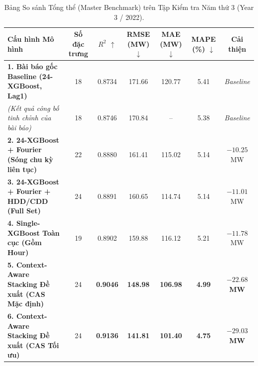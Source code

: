 \begin{table}[htbp]
    \centering
    \small
    \caption{Bảng So sánh Tổng thể (Master Benchmark) trên Tập Kiểm tra Năm thứ 3 (Year 3 / 2022).}
    \label{tab:master_benchmark}
    \begin{tabularx}{\textwidth}{lcccccc}
        \toprule
        \textbf{Cấu hình Mô hình} & \textbf{Số đặc trưng} & \textbf{$R^2$ $\uparrow$} & \textbf{RMSE (MW) $\downarrow$} & \textbf{MAE (MW) $\downarrow$} & \textbf{MAPE (\%) $\downarrow$} & \textbf{Cải thiện} \\
        \midrule
        \textbf{1. Bài báo gốc Baseline (24-XGBoost, Lag1)} & 18 & 0.8734 & 171.66 & 120.77 & 5.41 & \textit{Baseline} \\
        \textit{(Kết quả công bố tinh chỉnh của bài báo)} & 18 & 0.8746 & 170.84 & -- & 5.38 & \textit{Baseline} \\
        \addlinespace[0.4em]
        \textbf{2. 24-XGBoost + Fourier (Sóng chu kỳ liên tục)} & 22 & 0.8880 & 161.41 & 115.02 & 5.14 & $-10.25$ MW \\
        \textbf{3. 24-XGBoost + Fourier + HDD/CDD (Full Set)} & 24 & 0.8891 & 160.65 & 114.74 & 5.14 & $-11.01$ MW \\
        \addlinespace[0.4em]
        \textbf{4. Single-XGBoost Toàn cục (Gồm Hour)} & 19 & 0.8902 & 159.88 & 116.12 & 5.21 & $-11.78$ MW \\
        \addlinespace[0.4em]
        \textbf{5. Context-Aware Stacking Đề xuất (CAS Mặc định)} & 24 & \textbf{0.9046} & \textbf{148.98} & \textbf{106.98} & \textbf{4.99} & \textbf{$-22.68$ MW} \\
        \textbf{6. Context-Aware Stacking Đề xuất (CAS Tối ưu)} & 24 & \textbf{0.9136} & \textbf{141.81} & \textbf{101.40} & \textbf{4.75} & \textbf{$-29.03$ MW} \\
        \bottomrule
    \end{tabularx}
\end{table}

